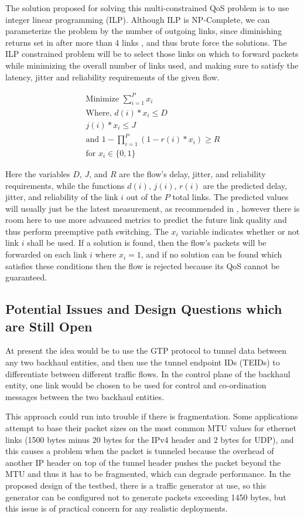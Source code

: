 The solution proposed for solving this multi-constrained QoS problem is to use integer linear programming (ILP). Although ILP is NP-Complete, we can parameterize the problem by the number of outgoing links, since diminishing returns set in after more than 4 links \cite{akella2003measurement}, and thus brute force the solutions. The ILP constrained problem will be to select those links on which to forward packets while minimizing the overall number of links used, and making sure to satisfy the latency, jitter and reliability requirements of the given flow.

\begin{gather}
\text{Minimize } \sum_{i=1}^{P}x_i \\
\text{Where, } d(i) * x_i\le D \\
j(i) * x_i \le J \\
\text{and }1 - \prod_{i=1}^{P}{ ( 1- r(i) * x_i ) } \ge R  \\
\text{for } x_i \in \{0,1\}
\end{gather}

Here the variables $D$, $J$, and $R$ are the flow's delay, jitter, and reliability requirements, while the functions $d(i)$, $j(i)$, $r(i)$ are the predicted delay, jitter, and reliability of the link $i$ out of the $P$ total links. The predicted values will usually just be the latest measurement, as recommended in \cite{akella2008performance}, however there is room here to use more advanced metrics to predict the future link quality and thus perform preemptive path switching. The $x_i$ variable indicates whether or not link $i$ shall be used. If a solution is found, then the flow's packets will be forwarded on each link $i$ where $x_i = 1$, and if no solution can be found which satisfies these conditions then the flow is rejected because its QoS cannot be guaranteed.

\subsection{Potential Issues and Design Questions which are Still Open}

At present the idea would be to use the GTP protocol to tunnel data between any two backhaul entities, and then use the tunnel endpoint IDs (TEIDs) to differentiate between different traffic flows. In the control plane of the backhaul entity, one link would be chosen to be used for control and co-ordination messages between the two backhaul entities.

This approach could run into trouble if there is fragmentation. Some applications attempt to base their packet sizes on the most common MTU values for ethernet links (1500 bytes  minus 20 bytes for the IPv4 header and 2 bytes for UDP), and this causes a problem when the packet is tunneled because the overhead of another IP header on top of the tunnel header pushes the packet beyond the MTU and thus it has to be fragmented, which can degrade performance. In the proposed design of the testbed, there is a traffic generator at use, so this generator can be configured not to  generate packets exceeding 1450 bytes, but this issue is of practical concern for any realistic deployments.

